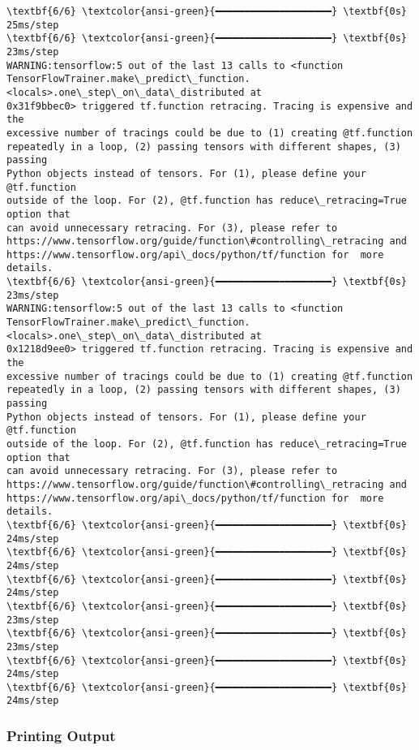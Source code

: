 \documentclass[11pt]{article}
\begin{document}
    \begin{Verbatim}[commandchars=\\\{\}]
\textbf{6/6} \textcolor{ansi-green}{━━━━━━━━━━━━━━━━━━━━} \textbf{0s} 25ms/step
\textbf{6/6} \textcolor{ansi-green}{━━━━━━━━━━━━━━━━━━━━} \textbf{0s} 23ms/step
WARNING:tensorflow:5 out of the last 13 calls to <function
TensorFlowTrainer.make\_predict\_function.<locals>.one\_step\_on\_data\_distributed at
0x31f9bbec0> triggered tf.function retracing. Tracing is expensive and the
excessive number of tracings could be due to (1) creating @tf.function
repeatedly in a loop, (2) passing tensors with different shapes, (3) passing
Python objects instead of tensors. For (1), please define your @tf.function
outside of the loop. For (2), @tf.function has reduce\_retracing=True option that
can avoid unnecessary retracing. For (3), please refer to
https://www.tensorflow.org/guide/function\#controlling\_retracing and
https://www.tensorflow.org/api\_docs/python/tf/function for  more details.
\textbf{6/6} \textcolor{ansi-green}{━━━━━━━━━━━━━━━━━━━━} \textbf{0s} 23ms/step
WARNING:tensorflow:5 out of the last 13 calls to <function
TensorFlowTrainer.make\_predict\_function.<locals>.one\_step\_on\_data\_distributed at
0x1218d9ee0> triggered tf.function retracing. Tracing is expensive and the
excessive number of tracings could be due to (1) creating @tf.function
repeatedly in a loop, (2) passing tensors with different shapes, (3) passing
Python objects instead of tensors. For (1), please define your @tf.function
outside of the loop. For (2), @tf.function has reduce\_retracing=True option that
can avoid unnecessary retracing. For (3), please refer to
https://www.tensorflow.org/guide/function\#controlling\_retracing and
https://www.tensorflow.org/api\_docs/python/tf/function for  more details.
\textbf{6/6} \textcolor{ansi-green}{━━━━━━━━━━━━━━━━━━━━} \textbf{0s} 24ms/step
\textbf{6/6} \textcolor{ansi-green}{━━━━━━━━━━━━━━━━━━━━} \textbf{0s} 24ms/step
\textbf{6/6} \textcolor{ansi-green}{━━━━━━━━━━━━━━━━━━━━} \textbf{0s} 24ms/step
\textbf{6/6} \textcolor{ansi-green}{━━━━━━━━━━━━━━━━━━━━} \textbf{0s} 23ms/step
\textbf{6/6} \textcolor{ansi-green}{━━━━━━━━━━━━━━━━━━━━} \textbf{0s} 23ms/step
\textbf{6/6} \textcolor{ansi-green}{━━━━━━━━━━━━━━━━━━━━} \textbf{0s} 24ms/step
\textbf{6/6} \textcolor{ansi-green}{━━━━━━━━━━━━━━━━━━━━} \textbf{0s} 24ms/step
    \end{Verbatim}

    \subsubsection{Printing Output}\label{printing-output}
\end{document}
